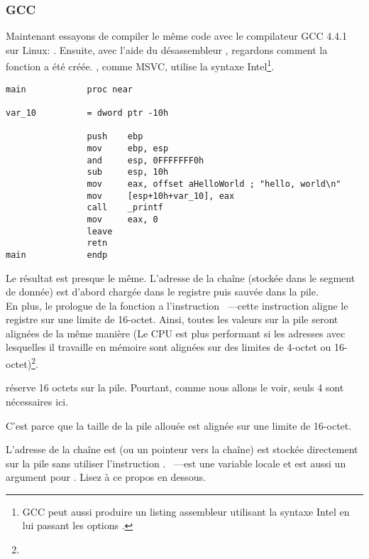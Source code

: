 \subsubsection{GCC}

Maintenant essayons de compiler le même code \CCpp avec le compilateur GCC 4.4.1 sur Linux: .
Ensuite, avec l'aide du désassembleur \IDA, regardons comment la fonction \main a été créée.
\IDA, comme MSVC, utilise la syntaxe Intel\footnote{GCC peut aussi produire un listing assembleur utilisant la syntaxe Intel en lui passant les options .}.

\begin{lstlisting}[caption=code in \IDA,style=customasmx86]
main            proc near

var_10          = dword ptr -10h

                push    ebp
                mov     ebp, esp
                and     esp, 0FFFFFFF0h
                sub     esp, 10h
                mov     eax, offset aHelloWorld ; "hello, world\n"
                mov     [esp+10h+var_10], eax
                call    _printf
                mov     eax, 0
                leave
                retn
main            endp
\end{lstlisting}

Le résultat est presque le même.
L'adresse de la chaîne  (stockée dans le segment de donnée) est d'abord chargée dans
 le registre \EAX puis sauvée dans la pile. \\
En plus, le prologue de la fonction a l'instruction ~---cette
instruction aligne le registre \ESP sur une limite de 16-octet.
Ainsi, toutes les valeurs sur la pile seront alignées de la même manière (Le CPU
est plus performant si les adresses avec lesquelles il travaille en mémoire sont
alignées sur des limites de 4-octet ou 16-octet)\footnote{\URLWPDA}.

 réserve 16 octets sur la pile. Pourtant, comme nous allons le voir, seuls 4 sont nécessaires ici.

C'est parce que la taille de la pile allouée est alignée sur une limite de 16-octet.

L'adresse de la chaîne est (ou un pointeur vers la chaîne) est stockée directement sur la pile sans utiliser
l'instruction \PUSH.
~---est une variable locale et est aussi un argument pour \printf{}.
Lisez à ce propos en dessous.

